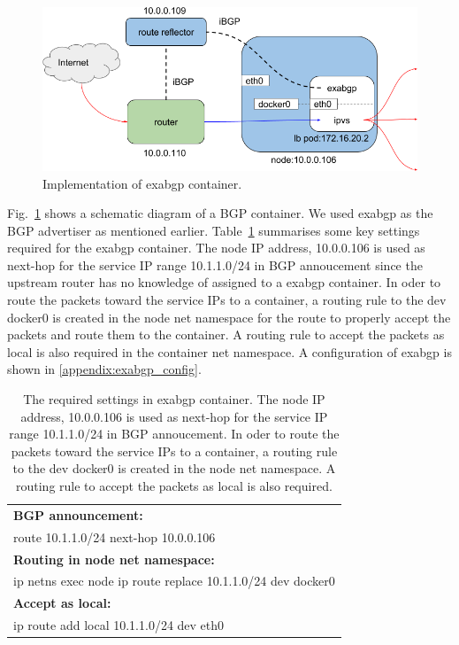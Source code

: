\begin{figure}
\includegraphics[width=\columnwidth]{Figs/exabgp}
\caption{Implementation of exabgp container.}
\label{fig:exabgp}
\end{figure}

Fig.~\ref{fig:exabgp} shows a schematic diagram of a BGP container. We used exabgp as the BGP advertiser as mentioned earlier.
Table~\ref{table:exabgp} summarises some key settings required for the exabgp container.
The node IP address, 10.0.0.106 is used as next-hop for the service IP range 10.1.1.0/24 in BGP annoucement since the upstream router has no knowledge of assigned to a exabgp container. 
In oder to route the packets toward the service IPs to a container, a routing rule to the dev docker0 is created in the node net namespace for the route to properly accept the packets and route them to the container.
A routing rule to accept the packets as local is also required in the container net namespace. 
A configuration of exabgp is shown in \ref{appendix:exabgp_config}.

\begin{table}[tb]%
\begin{center}
\begin{tabular}{l}
\hline
\textbf{BGP announcement:}\\
\hspace*{5mm} route 10.1.1.0/24 next-hop 10.0.0.106 \\
\textbf{Routing in node net namespace:}\\
\hspace*{5mm} ip netns exec node ip route replace 10.1.1.0/24 dev docker0 \\
\textbf{Accept as local:}\\
\hspace*{5mm} ip route add local 10.1.1.0/24 dev eth0 \\
\hline
\end{tabular}
\halflineskip

\caption{
  The required settings in exabgp container.
  The node IP address, 10.0.0.106 is used as next-hop for the service IP range 10.1.1.0/24 in BGP annoucement.
  In oder to route the packets toward the service IPs to a container, a routing rule to the dev docker0 is created in the node net namespace.
  A routing rule to accept the packets as local is also required. 
}
\label{table:exabgp}

\end{center}
\end{table}

